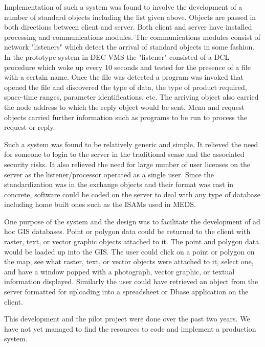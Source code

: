 	Implementation of such a system was found to involve the 
development of a number of standard objects including the list given 
above.  Objects are passed in both directions between client and server.  
Both client and server have installed processing and communications 
modules.  The communications modules consist of network "listeners" 
which detect the arrival of standard objects in some fashion.  In the 
prototype system in DEC VMS the "listener" consisted of a DCL procedure 
which woke up every 10 seconds and tested for the presence of a file with 
a certain name.  Once the file was detected a program was invoked that 
opened the file and discovered the type of data, the type of product 
required, space-time ranges, parameter identifications, etc.  The arriving 
object also carried the node address to which the reply object would be 
sent.  Menu and request objects carried further information such as 
programs to be run to process the request or reply.

	Such a system was found to be relatively generic and simple.  It 
relieved the need for someone to login to the server in the traditional 
sense and the associated security risks.  It also relieved the need for 
large number of user licenses on the server as the listener/processor 
operated as a single user.  Since the standardization was in the exchange 
objects and their format was cast in concrete, software could be coded on 
the server to deal with any type of database including home built ones 
such as the ISAMs used in MEDS.

	One purpose of the system and the design was to facilitate the 
development of ad hoc GIS databases.  Point or polygon data could be 
returned to the client with raster, text, or vector graphic objects 
attached to it.  The point and polygon data would be loaded up into the GIS.  
The user could click on a point or polygon on the map, see what raster, 
text, or vector objects were attached to it, select one, and have a window 
popped with a photograph, vector graphic, or textual information 
displayed.  Similarly the user could have retrieved an object from the 
server formatted for uploading into a spreadsheet or Dbase application on 
the client.

	This development and the pilot project were done over the past two 
years.  We have not yet managed to find the resources to code and 
implement a production system.
\newpage

